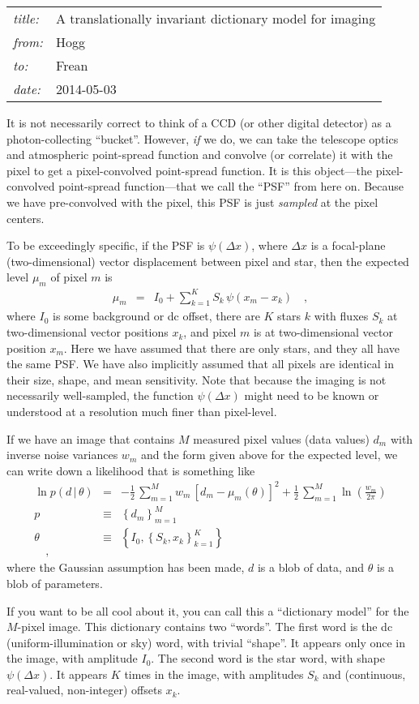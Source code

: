 \documentclass[12pt]{article}
\newcommand{\given}{\,|\,}
\begin{document}
\sloppy\sloppypar

\noindent
\begin{tabular}{ll}
\textsl{title:}   & A translationally invariant dictionary model for imaging  \\
\textsl{from:}    & Hogg \\
\textsl{to:}      & Frean \\
\textsl{date:}    & 2014-05-03
\end{tabular}
\bigskip

It is not necessarily correct to think of a CCD (or other digital
detector) as a photon-collecting ``bucket''.
However, \emph{if} we do, we can take the telescope optics and
atmospheric point-spread function and convolve (or correlate) it with
the pixel to get a pixel-convolved point-spread function.
It is this object---the pixel-convolved point-spread function---that
we call the ``PSF'' from here on.
Because we have pre-convolved with the pixel, this PSF is just
\emph{sampled} at the pixel centers.

To be exceedingly specific, if the PSF is $\psi(\Delta x)$, where
$\Delta x$ is a focal-plane (two-dimensional) vector displacement
between pixel and star, then the expected level $\mu_m$ of pixel $m$
is
\begin{eqnarray}
\mu_m &=& I_0 + \sum_{k=1}^K S_k\,\psi(x_m - x_k)
\quad ,
\end{eqnarray}
where $I_0$ is some background or dc offset, there are $K$ stars $k$
with fluxes $S_k$ at two-dimensional vector positions $x_k$, and pixel
$m$ is at two-dimensional vector position $x_m$.
Here we have assumed that there are only stars, and they all have the
same PSF.
We have also implicitly assumed that all pixels are identical in their
size, shape, and mean sensitivity.
Note that because the imaging is not necessarily well-sampled, the
function $\psi(\Delta x)$ might need to be known or understood at a
resolution much finer than pixel-level.

If we have an image that contains $M$ measured pixel values (data
values) $d_m$ with inverse noise variances $w_m$ and the form given
above for the expected level, we can write down a likelihood that is
something like
\begin{eqnarray}
\ln p(d\given\theta) &=& -\frac{1}{2}\,\sum_{m=1}^M w_m\,[d_m - \mu_m(\theta)]^2 + \frac{1}{2}\,\sum_{m=1}^M \ln(\frac{w_m}{2\pi})
\\
p &\equiv& \left\{d_m\right\}_{m=1}^M
\\
\theta &\equiv& \left\{I_0, \left\{S_k, x_k\right\}_{k=1}^K\right\}
\\
\quad,
\end{eqnarray}
where the Gaussian assumption has been made, $d$ is a blob of data,
and $\theta$ is a blob of parameters.

If you want to be all cool about it, you can call this a ``dictionary
model'' for the $M$-pixel image.
This dictionary contains two ``words''.
The first word is the dc (uniform-illumination or sky) word, with
trivial ``shape''.
It appears only once in the image, with amplitude $I_0$.
The second word is the star word, with shape $\psi(\Delta x)$.
It appears $K$ times in the image, with amplitudes $S_k$ and
(continuous, real-valued, non-integer) offsets $x_k$.
\end{document}
